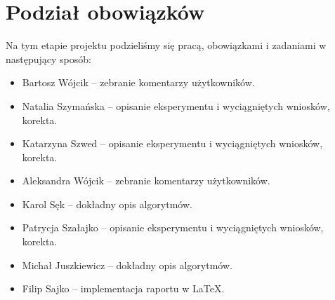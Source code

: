 \documentclass[]{mwart}
\begin{document}
\section{Podział obowiązków}
Na tym etapie projektu podzieliśmy się pracą, obowiązkami i zadaniami w następujący sposób:

\begin{itemize}
    \item Bartosz Wójcik -- zebranie komentarzy użytkowników.
    \item Natalia Szymańska -- opisanie eksperymentu i wyciągniętych wniosków, korekta. %
    \item Katarzyna Szwed -- opisanie eksperymentu i wyciągniętych wniosków, korekta.
    \item Aleksandra Wójcik -- zebranie komentarzy użytkowników.
    \item Karol Sęk -- dokładny opis algorytmów.
    \item Patrycja Szałajko -- opisanie eksperymentu i wyciągniętych wniosków, korekta.
    \item Michał Juszkiewicz -- dokładny opis algorytmów.
    \item Filip Sajko -- implementacja raportu w \LaTeX{}.
\end{itemize}
\end{document}
